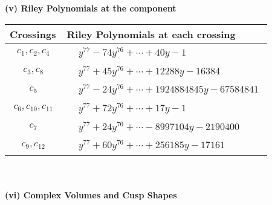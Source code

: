 \documentclass[1p]{elsarticle_modified}
\theoremstyle{definition}
\begin{document}
\newpage\renewcommand{\arraystretch}{1}
\flushleft \textbf{(v) Riley Polynomials at the component}\newline \\
\begin{tabular}{m{50pt}|m{274pt}}
Crossings & \hspace{64pt}Riley Polynomials at each crossing \\
\hline $$\begin{aligned}c_{1},c_{2},c_{4}\end{aligned}$$&$\begin{aligned}
&y^{77}-74 y^{76}+\cdots+40 y-1
\end{aligned}$\\
\hline $$\begin{aligned}c_{3},c_{8}\end{aligned}$$&$\begin{aligned}
&y^{77}+45 y^{76}+\cdots+12288 y-16384
\end{aligned}$\\
\hline $$\begin{aligned}c_{5}\end{aligned}$$&$\begin{aligned}
&y^{77}-24 y^{76}+\cdots+1924884845 y-67584841
\end{aligned}$\\
\hline $$\begin{aligned}c_{6},c_{10},c_{11}\end{aligned}$$&$\begin{aligned}
&y^{77}+72 y^{76}+\cdots+17 y-1
\end{aligned}$\\
\hline $$\begin{aligned}c_{7}\end{aligned}$$&$\begin{aligned}
&y^{77}+24 y^{76}+\cdots-8997104 y-2190400
\end{aligned}$\\
\hline $$\begin{aligned}c_{9},c_{12}\end{aligned}$$&$\begin{aligned}
&y^{77}+60 y^{76}+\cdots+256185 y-17161
\end{aligned}$\\
\hline
\end{tabular}\\~\\
\newpage\flushleft \textbf{(vi) Complex Volumes and Cusp Shapes}
\end{document}

